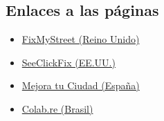 \subsection*{Enlaces a las páginas}
\begin{minipage}[t]{0.48\textwidth}
\begin{itemize}
    \item \href{https://www.fixmystreet.com/}{FixMyStreet (Reino Unido)}
    \item \href{https://play.google.com/store/apps/details?id=com.seeclickfix.ma.android&hl=es_MX}{SeeClickFix (EE.UU.)}
\end{itemize}
\end{minipage}
\hfill
\begin{minipage}[t]{0.48\textwidth}
\begin{itemize}
    \item \href{https://mejoratuciudad.org/}{Mejora tu Ciudad (España)}
    \item \href{https://www.colab.com.br/sou-cidadao/}{Colab.re (Brasil)}
\end{itemize}
\end{minipage}


